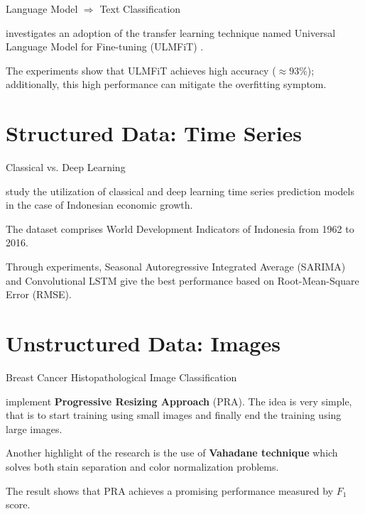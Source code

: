 \documentclass[aspectratio=169]{beamer}
\begin{document}
\begin{frame}{Language Model $\Rightarrow$ Text Classification}
	\begin{vfilleditems}
		\item \citet{bunyamin2021utilizing}  investigates an adoption of the transfer learning technique named Universal Language Model for Fine-tuning (ULMFiT) \citep{howard-ruder-2018-universal}.
		\item  The experiments show that ULMFiT achieves high accuracy ($\approx 93\%$); additionally, this high performance can mitigate the overfitting symptom.
	\end{vfilleditems}		
\end{frame}

\section{Structured Data: Time Series}
\begin{frame}{Classical vs. Deep Learning}
	\begin{vfilleditems}
	\item \citet{Bunyamin_2021} study the utilization of classical and deep learning time series prediction models in the case of Indonesian economic growth. 
	\item The dataset comprises World Development Indicators of Indonesia from 1962 to 2016. 
	\item Through experiments, Seasonal Autoregressive Integrated Average (SARIMA) and Convolutional LSTM give the best performance based on Root-Mean-Square Error (RMSE).
\end{vfilleditems}			
\end{frame}

\section{Unstructured Data: Images}
\begin{frame}{Breast Cancer Histopathological Image Classification}
	\begin{vfilleditems}
		\item \citet{ice-tes22} implement \textbf{Progressive Resizing Approach} (PRA). The idea is very simple, that is to start training using small images and finally end the training using large images.
		\item Another highlight of the research is the use of \textbf{Vahadane technique}  \citep{vahadane2016structure} which solves both stain separation and color normalization problems.
		\item The result shows that PRA achieves a promising performance measured by $F_1$ score.
	\end{vfilleditems}			
\end{frame}
\end{document}

